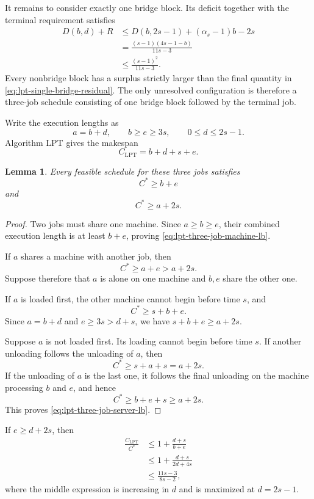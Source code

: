 \documentclass[11pt]{article}
\newtheorem{lemma}{Lemma}
\begin{document}
It remains to consider exactly one bridge block. Its deficit together with the
terminal requirement satisfies
\[
\begin{aligned}
D(b,d)+R
&\le
D(b,2s-1)+(\alpha_s-1)b-2s\\
&=
\frac{(s-1)(4s-1-b)}{11s-3}\\
&\le
\frac{(s-1)^2}{11s-3}.
\end{aligned}
\tag{A.14}
\label{eq:lpt-single-bridge-residual}
\]
Every nonbridge block has a surplus strictly larger than the final quantity in
\eqref{eq:lpt-single-bridge-residual}. The only unresolved configuration is
therefore a three-job schedule consisting of one bridge block followed by the
terminal job.

Write the execution lengths as
\[
a=b+d,
\qquad
b\ge e\ge3s,
\qquad
0\le d\le2s-1.
\]
Algorithm LPT gives the makespan
\[
C_{\mathrm{LPT}}=b+d+s+e.
\tag{A.15}
\label{eq:lpt-three-job-lpt}
\]

\begin{lemma}
\label{lem:lpt-three-job-lbs}
Every feasible schedule for these three jobs satisfies
\[
C^*\ge b+e
\tag{A.16}
\label{eq:lpt-three-job-machine-lb}
\]
and
\[
C^*\ge a+2s.
\tag{A.17}
\label{eq:lpt-three-job-server-lb}
\]
\end{lemma}

\begin{proof}
Two jobs must share one machine. Since \(a\ge b\ge e\), their combined
execution length is at least \(b+e\), proving
\eqref{eq:lpt-three-job-machine-lb}.

If \(a\) shares a machine with another job, then
\[
C^*\ge a+e>a+2s.
\]
Suppose therefore that \(a\) is alone on one machine and \(b,e\) share the
other one.

If \(a\) is loaded first, the other machine cannot begin before time \(s\),
and
\[
C^*\ge s+b+e.
\]
Since \(a=b+d\) and \(e\ge3s>d+s\), we have
\(s+b+e\ge a+2s\).

Suppose \(a\) is not loaded first. Its loading cannot begin before time \(s\).
If another unloading follows the unloading of \(a\), then
\[
C^*\ge s+a+s=a+2s.
\]
If the unloading of \(a\) is the last one, it follows the final unloading on the
machine processing \(b\) and \(e\), and hence
\[
C^*\ge b+e+s\ge a+2s.
\]
This proves \eqref{eq:lpt-three-job-server-lb}.
\end{proof}

If \(e\ge d+2s\), then
\[
\begin{aligned}
\frac{C_{\mathrm{LPT}}}{C^*}
&\le
1+\frac{d+s}{b+e}\\
&\le
1+\frac{d+s}{2d+4s}\\
&\le
\frac{11s-3}{8s-2},
\end{aligned}
\]
where the middle expression is increasing in \(d\) and is maximized at
\(d=2s-1\).
\end{document}
